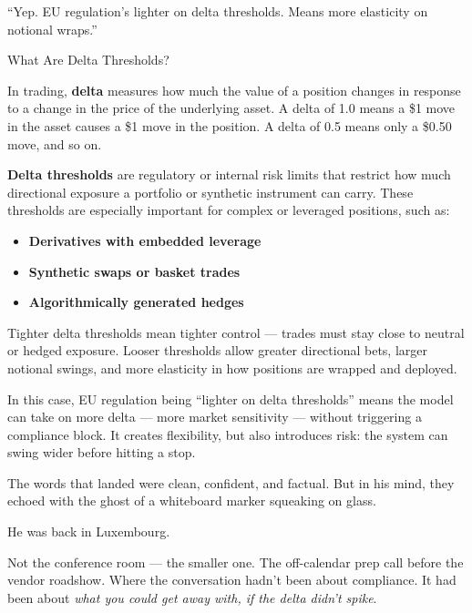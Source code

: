 “Yep. EU regulation’s lighter on delta thresholds. Means more elasticity on notional wraps.”

\medskip

\begin{TechnicalSidebar}{What Are Delta Thresholds?}

  In trading, \textbf{delta} measures how much the value of a position changes in response to a change in the price 
  of the underlying asset.  
  A delta of 1.0 means a \$1 move in the asset causes a \$1 move in the position. A delta of 0.5 means only a \$0.50 
  move, and so on.

  \medskip

  \textbf{Delta thresholds} are regulatory or internal risk limits that restrict how much directional exposure a 
  portfolio or synthetic instrument can carry.  
  These thresholds are especially important for complex or leveraged positions, such as:

  \medskip

  \begin{itemize}
    \item \textbf{Derivatives with embedded leverage}
    \item \textbf{Synthetic swaps or basket trades}
    \item \textbf{Algorithmically generated hedges}
  \end{itemize}

  \medskip

  Tighter delta thresholds mean tighter control — trades must stay close to neutral or hedged exposure.  
  Looser thresholds allow greater directional bets, larger notional swings, and more elasticity in how positions 
  are wrapped and deployed.

  \medskip

  In this case, EU regulation being “lighter on delta thresholds” means the model can take on more delta — more 
  market sensitivity —  
  without triggering a compliance block. It creates flexibility, but also introduces risk: the system can swing 
  wider before hitting a stop.

\end{TechnicalSidebar}

\medskip

The words that landed were clean, confident, and factual.
But in his mind, they echoed with the ghost of a whiteboard marker squeaking on glass.

He was back in Luxembourg.

Not the conference room — the smaller one. The off-calendar prep call before the vendor roadshow.
Where the conversation hadn’t been about compliance. It had been about \textit{what you could get away with, if the delta didn’t spike}.

